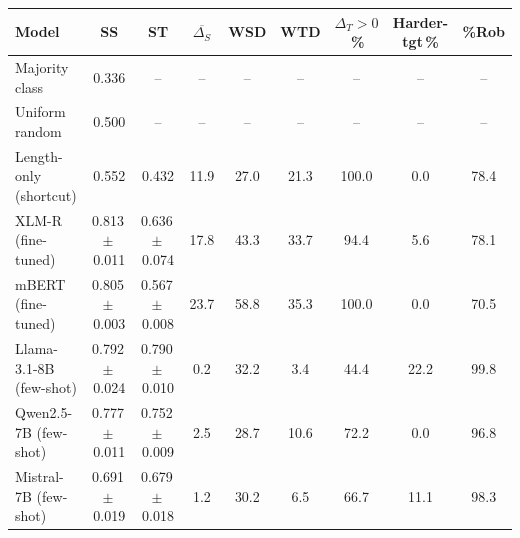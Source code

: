 \begin{tabular}{lcccccccc}
\toprule
Model & SS & ST & $\overline{\Delta_S}$ & WSD & WTD & $\Delta_T{>}0$\,\% & Harder-tgt\,\% & \%Rob \\
\midrule
Majority class & 0.336 & -- & -- & -- & -- & -- & -- & -- \\
Uniform random & 0.500 & -- & -- & -- & -- & -- & -- & -- \\
Length-only (shortcut) & 0.552 & 0.432 & 11.9 & 27.0 & 21.3 & 100.0 & 0.0 & 78.4 \\
\midrule
XLM-R (fine-tuned) & 0.813\,$\pm$\,0.011 & 0.636\,$\pm$\,0.074 & 17.8 & 43.3 & 33.7 & 94.4 & 5.6 & 78.1 \\
mBERT (fine-tuned) & 0.805\,$\pm$\,0.003 & 0.567\,$\pm$\,0.008 & 23.7 & 58.8 & 35.3 & 100.0 & 0.0 & 70.5 \\
\midrule
Llama-3.1-8B (few-shot) & 0.792\,$\pm$\,0.024 & 0.790\,$\pm$\,0.010 & 0.2 & 32.2 & 3.4 & 44.4 & 22.2 & 99.8 \\
Qwen2.5-7B (few-shot) & 0.777\,$\pm$\,0.011 & 0.752\,$\pm$\,0.009 & 2.5 & 28.7 & 10.6 & 72.2 & 0.0 & 96.8 \\
Mistral-7B (few-shot) & 0.691\,$\pm$\,0.019 & 0.679\,$\pm$\,0.018 & 1.2 & 30.2 & 6.5 & 66.7 & 11.1 & 98.3 \\
\bottomrule
\end{tabular}
